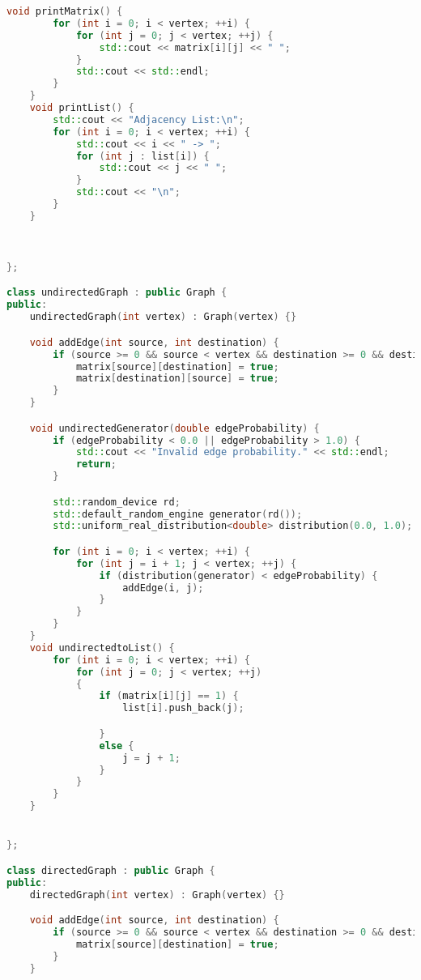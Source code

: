\documentclass{article}
\begin{document}
\begin {small}
\begin{lstlisting}[language=C++]
    void printMatrix() {
        for (int i = 0; i < vertex; ++i) {
            for (int j = 0; j < vertex; ++j) {
                std::cout << matrix[i][j] << " ";
            }
            std::cout << std::endl;
        }
    }
    void printList() {
        std::cout << "Adjacency List:\n";
        for (int i = 0; i < vertex; ++i) {
            std::cout << i << " -> ";
            for (int j : list[i]) {
                std::cout << j << " ";
            }
            std::cout << "\n";
        }
    }

    

};

class undirectedGraph : public Graph {
public:
    undirectedGraph(int vertex) : Graph(vertex) {}

    void addEdge(int source, int destination) {
        if (source >= 0 && source < vertex && destination >= 0 && destination < vertex) {
            matrix[source][destination] = true;
            matrix[destination][source] = true;
        }
    }

    void undirectedGenerator(double edgeProbability) {
        if (edgeProbability < 0.0 || edgeProbability > 1.0) {
            std::cout << "Invalid edge probability." << std::endl;
            return;
        }

        std::random_device rd;
        std::default_random_engine generator(rd());
        std::uniform_real_distribution<double> distribution(0.0, 1.0);

        for (int i = 0; i < vertex; ++i) {
            for (int j = i + 1; j < vertex; ++j) {
                if (distribution(generator) < edgeProbability) {
                    addEdge(i, j);
                }
            }
        }
    }
    void undirectedtoList() {
        for (int i = 0; i < vertex; ++i) {
            for (int j = 0; j < vertex; ++j)
            {
                if (matrix[i][j] == 1) {
                    list[i].push_back(j);

                }
                else {
                    j = j + 1;
                }
            }
        }
    }


};

class directedGraph : public Graph {
public:
    directedGraph(int vertex) : Graph(vertex) {}

    void addEdge(int source, int destination) {
        if (source >= 0 && source < vertex && destination >= 0 && destination < vertex) {
            matrix[source][destination] = true;
        }
    }


\end{lstlisting}
\end{small}
\end{document}

